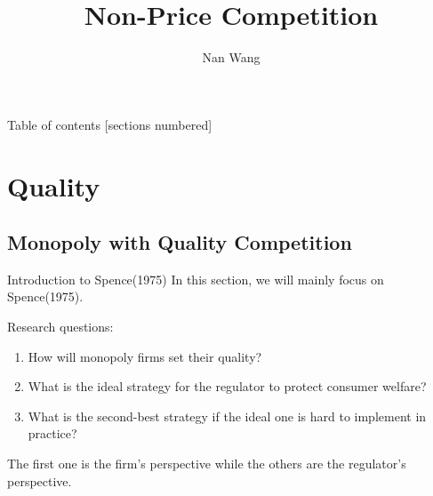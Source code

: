 \documentclass[10pt]{beamer}
\title{Non-Price Competition}
\subtitle{}
\author{Nan Wang}
\institute{Sauder School of Business}
\begin{document}
\begin{frame}
    \titlepage
\end{frame} 

\begin{frame}{Table of contents}
    [sections numbered]
    \tableofcontents%
  \end{frame}

\section{Quality}
\subsection{Monopoly with Quality Competition}
\begin{frame}{Introduction to Spence(1975)}
In this section, we will mainly focus on Spence(1975).

Research questions:
\begin{enumerate}
    \item How will monopoly firms set their quality?
    \item What is the ideal strategy for the regulator to protect consumer welfare?
    \item What is the second-best strategy if the ideal one is hard to implement in practice?
\end{enumerate}
The first one is the firm's perspective while the others are the regulator's perspective.
\end{frame}
\end{document}
